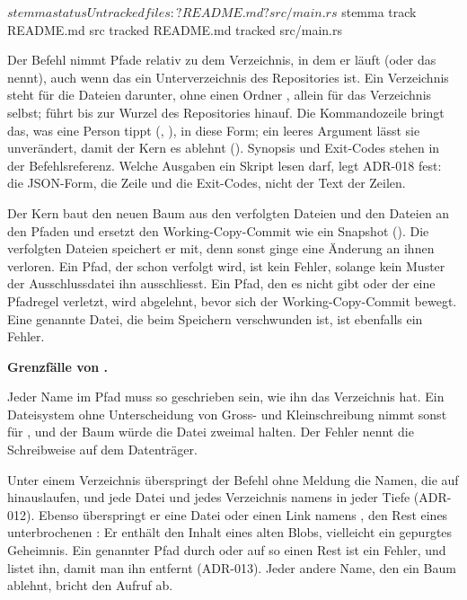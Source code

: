 \starttyping
$ stemma status
Untracked files:
? README.md
? src/main.rs
$ stemma track README.md src
tracked README.md
tracked src/main.rs
\stoptyping

Der Befehl nimmt Pfade relativ zu dem Verzeichnis, in dem er läuft (oder das  nennt),
auch wenn das ein Unterverzeichnis des Repositories ist.
Ein Verzeichnis steht für die Dateien darunter, ohne einen Ordner ,
 allein für das Verzeichnis selbst;
 führt bis zur Wurzel des Repositories hinauf.
Die Kommandozeile bringt das, was eine Person tippt (, ),
in diese Form;
ein leeres Argument lässt sie unverändert, damit der Kern es ablehnt ().
Synopsis und Exit-Codes stehen in der Befehlsreferenz.
Welche Ausgaben ein Skript lesen darf, legt ADR-018 fest: die JSON-Form, die Zeile 
und die Exit-Codes, nicht der Text der Zeilen.

Der Kern baut den neuen Baum aus den verfolgten Dateien und den Dateien an den Pfaden
und ersetzt den Working-Copy-Commit wie ein Snapshot ().
Die verfolgten Dateien speichert er mit, denn sonst ginge eine Änderung an ihnen verloren.
Ein Pfad, der schon verfolgt wird, ist kein Fehler,
solange kein Muster der Ausschlussdatei ihn ausschliesst.
Ein Pfad, den es nicht gibt oder der eine Pfadregel verletzt, wird abgelehnt,
bevor sich der Working-Copy-Commit bewegt.
Eine genannte Datei, die beim Speichern verschwunden ist, ist ebenfalls ein Fehler.

\startinfobox
{\bf Grenzfälle von .}
\startitemize
\item Jeder Name im Pfad muss so geschrieben sein, wie ihn das Verzeichnis hat.
Ein Dateisystem ohne Unterscheidung von Gross- und Kleinschreibung nimmt sonst
 für , und der Baum würde die Datei zweimal halten.
Der Fehler nennt die Schreibweise auf dem Datenträger.
\item Unter einem Verzeichnis überspringt der Befehl ohne Meldung die Namen,
die auf  hinauslaufen,
und jede Datei und jedes Verzeichnis namens  in jeder Tiefe (ADR-012).
Ebenso überspringt er eine Datei oder einen Link namens ,
den Rest eines unterbrochenen :
Er enthält den Inhalt eines alten Blobs, vielleicht ein gepurgtes Geheimnis.
Ein genannter Pfad durch  oder auf so einen Rest ist ein Fehler,
und  listet ihn, damit man ihn entfernt (ADR-013).
Jeder andere Name, den ein Baum ablehnt, bricht den Aufruf ab.
\stopitemize
\stopinfobox

